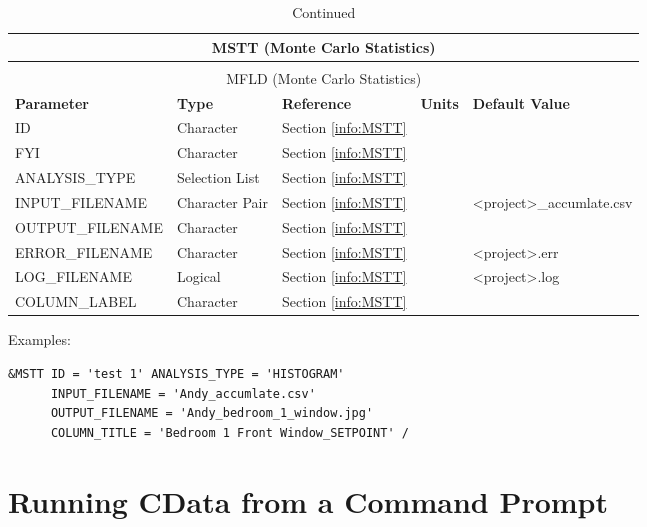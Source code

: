 \noindent
\renewcommand{\tabcolsep}{.1in}
\begin{longtable}{|l|l|l|l|l|}
\caption[Monte Carlo Statistics Plots  ({\ct MSTT} namelist group)]{For more information see Section~\ref{info:MSTT}.}
\label{tbl:MSTT} \\
\hline
\multicolumn{5}{|c|}{{\ct MSTT} (Monte Carlo Statistics)} \\
\hline \hline
\endfirsthead
\caption[]{Continued} \\
\hline
\multicolumn{5}{|c|}{{\ct MFLD} (Monte Carlo Statistics)} \\
\hline \hline
\endhead
\small
\parbox{1.5in}{\bf Parameter}    & \parbox{1in}{\bf Type}  & \parbox{1in}{\bf Reference}  & \parbox{1in}{\bf Units}  & \parbox{1in}{\bf Default Value} \\ \hline
{\ct ID}                         & Character         & Section \ref{info:MSTT}   &      &     \\ \hline
{\ct FYI}                        & Character         & Section \ref{info:MSTT}   &      &     \\ \hline
{\ct ANALYSIS\_TYPE}                       & Selection List    & Section \ref{info:MSTT}   &      &     \\ \hline
{\ct INPUT\_FILENAME}                      & Character Pair    & Section \ref{info:MSTT}   &    & <project>\_accumlate.csv  \\ \hline
{\ct OUTPUT\_FILENAME}              & Character         & Section \ref{info:MSTT}   &      &     \\ \hline
{\ct ERROR\_FILENAME}                   & Character         & Section \ref{info:MSTT}   &    &  <project>.err  \\ \hline
{\ct LOG\_FILENAME}        & Logical           & Section \ref{info:MSTT}   &      & <project>.log    \\ \hline
{\ct COLUMN\_LABEL}   & Character         & Section \ref{info:MSTT}   &      &     \\ \hline

\end{longtable}

\noindent Examples:
\begin{lstlisting}
&MSTT ID = 'test 1' ANALYSIS_TYPE = 'HISTOGRAM'
      INPUT_FILENAME = 'Andy_accumlate.csv'
      OUTPUT_FILENAME = 'Andy_bedroom_1_window.jpg'
      COLUMN_TITLE = 'Bedroom 1 Front Window_SETPOINT' /
\end{lstlisting}



\chapter{Running CData from a Command Prompt}

